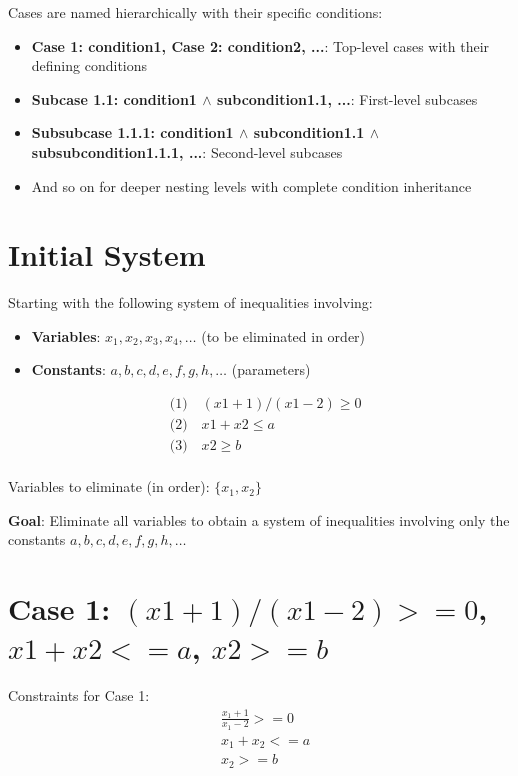 \documentclass{article}
\begin{document}
Cases are named hierarchically with their specific conditions:
\begin{itemize}
\item \textbf{Case 1: condition1, Case 2: condition2, ...}: Top-level cases with their defining conditions
\item \textbf{Subcase 1.1: condition1 $\wedge$ subcondition1.1, ...}: First-level subcases
\item \textbf{Subsubcase 1.1.1: condition1 $\wedge$ subcondition1.1 $\wedge$ subsubcondition1.1.1, ...}: Second-level subcases
\item And so on for deeper nesting levels with complete condition inheritance
\end{itemize}

\section{Initial System}

Starting with the following system of inequalities involving:
\begin{itemize}
\item \textbf{Variables}: $x_1, x_2, x_3, x_4, \ldots$ (to be eliminated in order)
\item \textbf{Constants}: $a, b, c, d, e, f, g, h, \ldots$ (parameters)
\end{itemize}

\begin{align}
& \text{(1)} \quad (x1 + 1)/(x1 - 2) \geq 0 \\
& \text{(2)} \quad x1 + x2 \leq a \\
& \text{(3)} \quad x2 \geq b \\
\end{align}

Variables to eliminate (in order): $\{x_{1}, x_{2}\}$

\textbf{Goal}: Eliminate all variables to obtain a system of inequalities
involving only the constants $a, b, c, d, e, f, g, h, \ldots$

\section{Case 1: $(x1 + 1)/(x1 - 2) >= 0$, $x1 + x2 <= a$, $x2 >= b$}

Constraints for Case 1:
\begin{align}
& \frac{x_{1} + 1}{x_{1} - 2} >= 0 \\
& x_{1} + x_{2} <= a \\
& x_{2} >= b \\
\end{align}
\end{document}
